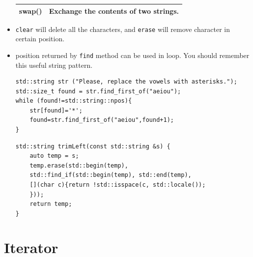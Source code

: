 \documentclass[a4paper,11pt,twoside]{book}
\newcommand{\tophline}{\hline }
\newcommand{\bottomhline}{\\ \hline }
\newcommand{\tophline}{ }
\newcommand{\bottomhline}{ }
\begin{document}
\begin{itemize}
\begin{tabular}{| p{} |p{}|}
		\tophline
		swap() & Exchange the contents of two strings. \bottomhline
	\end{tabular}
	
	\item \texttt{clear} will delete all the characters, and \texttt{erase} will remove character in certain position.
	
	\item position returned by \texttt{find} method can be used in loop. You should remember this useful string pattern.
\begin{lstlisting}[numbers=none]
std::string str ("Please, replace the vowels with asterisks.");
std::size_t found = str.find_first_of("aeiou");
while (found!=std::string::npos){
	str[found]='*';
	found=str.find_first_of("aeiou",found+1);
}
\end{lstlisting}

\begin{lstlisting}[numbers=none]
std::string trimLeft(const std::string &s) {
	auto temp = s;
	temp.erase(std::begin(temp), 
	std::find_if(std::begin(temp), std::end(temp), 
	[](char c){return !std::isspace(c, std::locale()); 
	}));
	return temp;
}
\end{lstlisting}
	
\end{itemize}

\section{Iterator}
\end{document}
